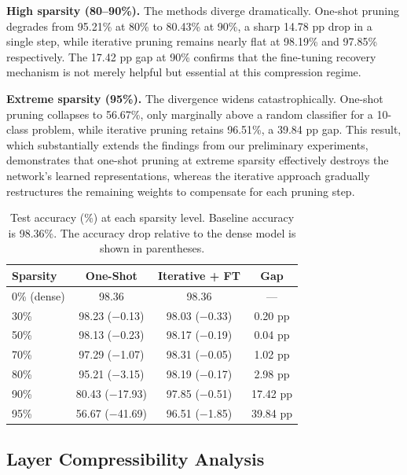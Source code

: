 \documentclass{article}
\begin{document}
\textbf{High sparsity (80--90\%).}
The methods diverge dramatically.
One-shot pruning degrades from 95.21\% at 80\% to 80.43\% at 90\%, a sharp 14.78 pp
drop in a single step, while iterative pruning remains nearly flat at 98.19\% and 97.85\%
respectively.
The 17.42 pp gap at 90\% confirms that the fine-tuning recovery mechanism is not merely
helpful but essential at this compression regime.

\textbf{Extreme sparsity (95\%).}
The divergence widens catastrophically.
One-shot pruning collapses to 56.67\%, only marginally above a random classifier for
a 10-class problem, while iterative pruning retains 96.51\%, a 39.84 pp gap.
This result, which substantially extends the findings from our preliminary experiments,
demonstrates that one-shot pruning at extreme sparsity effectively destroys the network's
learned representations, whereas the iterative approach gradually restructures the
remaining weights to compensate for each pruning step.

\begin{table}[t]
  \centering
  \caption{Test accuracy (\%) at each sparsity level. Baseline accuracy is 98.36\%.
    The accuracy drop relative to the dense model is shown in parentheses.}
  \label{tab:results}
  \begin{tabular}{@{}lccc@{}}
    \toprule
    \textbf{Sparsity} & \textbf{One-Shot} & \textbf{Iterative + FT} & \textbf{Gap} \\
    \midrule
    0\%  (dense) & 98.36          & 98.36          & —       \\
    30\%         & 98.23 ($-$0.13) & 98.03 ($-$0.33) & 0.20 pp \\
    50\%         & 98.13 ($-$0.23) & 98.17 ($-$0.19) & 0.04 pp \\
    70\%         & 97.29 ($-$1.07) & 98.31 ($-$0.05) & 1.02 pp \\
    80\%         & 95.21 ($-$3.15) & 98.19 ($-$0.17) & 2.98 pp \\
    90\%         & 80.43 ($-$17.93) & 97.85 ($-$0.51) & 17.42 pp \\
    95\%         & 56.67 ($-$41.69) & 96.51 ($-$1.85) & 39.84 pp \\
    \bottomrule
  \end{tabular}
\end{table}

\subsection{Layer Compressibility Analysis}
\end{document}
